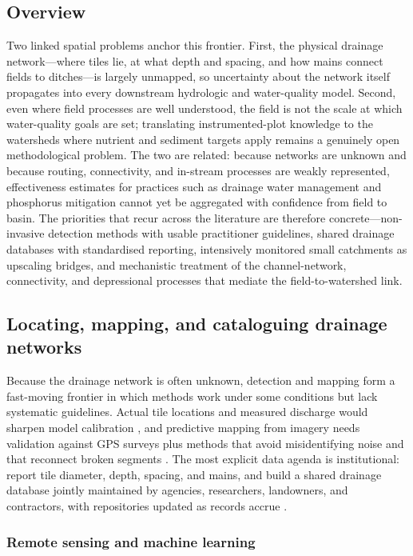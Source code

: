 \subsection{Overview}

Two linked spatial problems anchor this frontier. First, the physical drainage
network---where tiles lie, at what depth and spacing, and how mains connect
fields to ditches---is largely unmapped, so uncertainty about the network
itself propagates into every downstream hydrologic and water-quality model.
Second, even where field processes are well understood, the field is not the
scale at which water-quality goals are set; translating instrumented-plot
knowledge to the watersheds where nutrient and sediment targets apply remains a
genuinely open methodological problem. The two are related: because networks
are unknown and because routing, connectivity, and in-stream processes are
weakly represented, effectiveness estimates for practices such as drainage
water management and phosphorus mitigation cannot yet be aggregated with
confidence from field to basin. The priorities that recur across the literature
are therefore concrete---non-invasive detection methods with usable
practitioner guidelines, shared drainage databases with standardised reporting,
intensively monitored small catchments as upscaling bridges, and mechanistic
treatment of the channel-network, connectivity, and depressional processes that
mediate the field-to-watershed link.

\subsection{Locating, mapping, and cataloguing drainage networks}

Because the drainage network is often unknown, detection and mapping form a
fast-moving frontier in which methods work under some conditions but lack
systematic guidelines. Actual tile locations and measured discharge would
sharpen model calibration \parencite{Amado2018}, and predictive mapping from
imagery needs validation against GPS surveys plus methods that avoid
misidentifying noise and that reconnect broken segments
\parencite{Naz2009,Schilling2019}. The most explicit data agenda is
institutional: report tile diameter, depth, spacing, and mains, and build a
shared drainage database jointly maintained by agencies, researchers,
landowners, and contractors, with repositories updated as records accrue
\parencite{Zhou2025,Valayamkunnath2020}.

\subsubsection{Remote sensing and machine learning}


